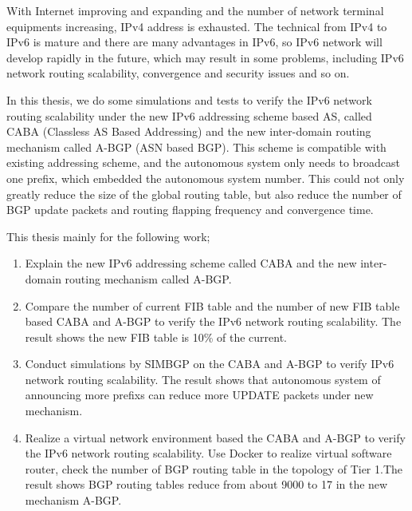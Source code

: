 \begin{eabstract}
With Internet improving and expanding and the number of network terminal equipments increasing, IPv4 address is exhausted. The technical from IPv4 to IPv6 is mature and there are many advantages in IPv6, so IPv6 network will develop rapidly in the future, which may result in some problems, including IPv6 network routing scalability, convergence and security issues and so on.

In this thesis, we do some simulations and tests to verify the IPv6 network routing scalability under the new IPv6 addressing scheme based AS, called CABA (Classless AS Based Addressing) and the new inter-domain routing mechanism called A-BGP (ASN based BGP). This scheme is compatible with existing addressing scheme, and the autonomous system only needs to broadcast one prefix, which embedded the autonomous system number. This could not only greatly reduce the size of the global routing table, but also reduce the number of BGP update packets and routing flapping frequency and convergence time.

This thesis mainly for the following work;


\begin{enumerate}
\item Explain the new IPv6 addressing scheme called CABA and the new inter-domain routing mechanism called A-BGP.
\item Compare the number of current FIB table and the number of new FIB table based CABA and A-BGP to verify the IPv6 network routing scalability. The result shows the new FIB table is 10\% of the current.
\item Conduct simulations by SIMBGP on the CABA and A-BGP to verify IPv6 network routing scalability. The result shows that autonomous system of announcing more prefixs can reduce more UPDATE packets under new mechanism.
\item Realize a virtual network environment based the CABA and A-BGP to verify the IPv6 network routing scalability. Use Docker to realize virtual software router, check the number of BGP routing table in the topology of Tier 1.The result shows BGP routing tables reduce from about 9000 to 17 in the new mechanism A-BGP.
\end{enumerate}

\end{eabstract}

